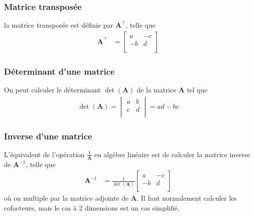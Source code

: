 \documentclass[10pt, french]{article}
\begin{document}
\begin{multicols*}{3}
\subsubsection*{Matrice transposée} la matrice transposée est définie par $\bm{A}^\top$, telle que
\begin{align*}
\bm{A}^{\top} & = 
\begin{bmatrix}
a	& -c \\
-b	& d \\
\end{bmatrix}
\end{align*}

\subsubsection*{Déterminant d'une matrice} On peut calculer le déterminant $\det(\bm{A})$ de la matrice $\bm{A}$ tel que
\begin{align*}
\det(\bm{A})	  = 
\begin{vmatrix}
a	& b \\
c	& d \\
\end{vmatrix}
= ad - bc
\end{align*}

\subsubsection*{Inverse d'une matrice} L'équivalent de l'opération $\frac{1}{\bm{A}}$ en algèbre linéaire est de calculer la matrice inverse de $\bm{A}^{-1}$, telle que
\begin{align*}
\bm{A}^{-1}	& = \frac{1}{\det(\bm{A})}
\begin{bmatrix}
a	& -c \\
-b	& d \\
\end{bmatrix}
\end{align*}
où on multiple par la matrice adjointe de $\bm{A}$. Il faut normalement calculer les cofacteurs, mais le cas à 2 dimensions est un cas simplifié.



\end{multicols*}


\end{document}

